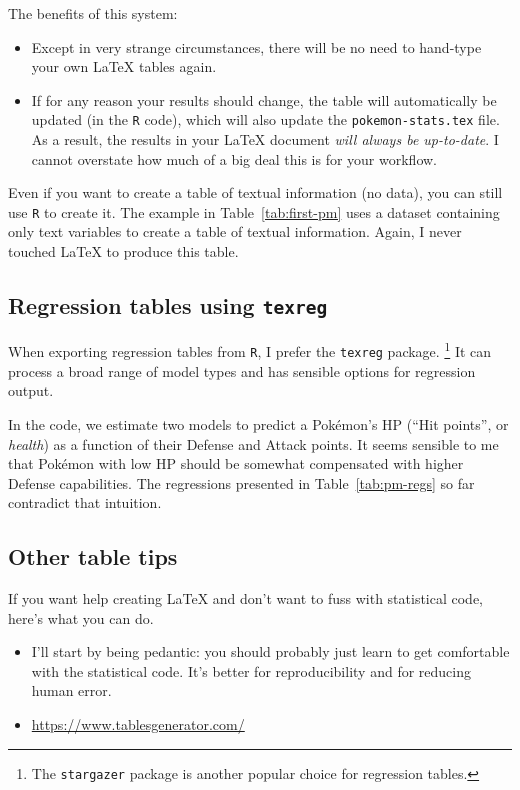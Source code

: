 \documentclass[12pt
              ]{article}
\begin{document}


The benefits of this system:
\begin{itemize}
 \item Except in very strange circumstances, there will be no need to hand-type your own {\LaTeX} tables again.
 \item If for any reason your results should change, the table will automatically be updated (in the \texttt{R} code), which will also update the \texttt{pokemon-stats.tex} file. As a result, the results in your {\LaTeX} document \emph{will always be up-to-date}. I cannot overstate how much of a big deal this is for your workflow.
\end{itemize}

Even if you want to create a table of textual information (no data), you can still use \texttt{R} to create it. The example in Table~\ref{tab:first-pm} uses a dataset containing only text variables to create a table of textual information. Again, I never touched {\LaTeX} to produce this table.





\subsection{Regression tables using \texttt{texreg}}

When exporting regression tables from \texttt{R}, I prefer the \texttt{texreg} package.%
  \footnote{The \texttt{stargazer} package is another popular choice for regression tables.} 
It can process a broad range of model types and has sensible options for regression output.

In the code, we estimate two models to predict a Pok\'emon's HP (``Hit points'', or \emph{health}) as a function of their Defense and Attack points. It seems sensible to me that Pok\'emon with low HP should be somewhat compensated with higher Defense capabilities. The regressions presented in Table~\ref{tab:pm-regs} so far contradict that intuition.




\subsection{Other table tips}

If you want help creating {\LaTeX} and don't want to fuss with statistical code, here's what you can do.
\begin{itemize}
 \item I'll start by being pedantic: you should probably just learn to get comfortable with the statistical code. It's better for reproducibility and for reducing human error.
 \item \url{https://www.tablesgenerator.com/}
\end{itemize}
\end{document}
